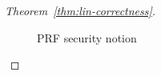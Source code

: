 \begin{proof}[Theorem~\ref{thm:lin-correctness}]
\begin{figure}[tp]
\centering
{}
\caption{PRF security notion}\label{fig:prf}
\end{figure}

\end{proof}


